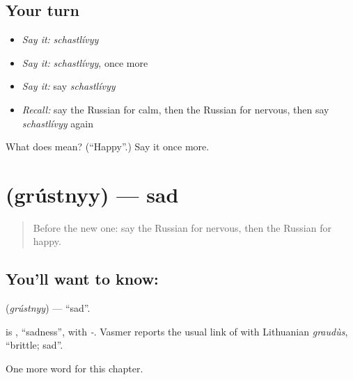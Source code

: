 \subsection*{Your turn}
\begin{itemize}
\raggedright
  \item \emph{Say it:} \emph{schastlívyy}
  \item \emph{Say it:} \emph{schastlívyy}, once more
  \item \emph{Say it:} say \emph{schastlívyy}
  \item \emph{Recall:} say the Russian for calm, then the Russian for nervous, then say \emph{schastlívyy} again
\end{itemize}

\begin{tcolorbox}[breakable,colback=teal!4,colframe=teal!35!black,title={Before you move on}]
What does  mean? (\textquotedblleft{}Happy\textquotedblright{}.) Say it once more.
\end{tcolorbox}
\section[\texorpdfstring{\ru{грустный} (grústnyy)}{грустный (grústnyy)}]{ (grústnyy) — sad}

\label{lesson:RU-C216-grustnyy}



\begin{quote}
Before the new one: say the Russian for nervous, then the Russian for happy.
\end{quote}

\subsection*{You'll want to know: }
\textbf{} (\emph{grústnyy}) — \textquotedblleft{}sad\textquotedblright{}.

\begin{cousinweb}
\textbf{} is \emph{}, \textquotedblleft{}sadness\textquotedblright{}, with \emph{-}. Vasmer reports the usual link of \emph{} with Lithuanian \emph{graudùs}, \textquotedblleft{}brittle; sad\textquotedblright{}.
\end{cousinweb}

\begin{grammarlens}[title={What you've built}]
One more word for this chapter.
\end{grammarlens}


